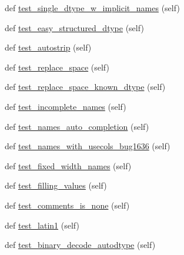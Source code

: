 \begin{DoxyCompactItemize}
\item 
def \hyperlink{classnumpy_1_1lib_1_1tests_1_1test__io_1_1TestFromTxt_a671e31bbe4da18bccec95fed75faee1b}{test\+\_\+single\+\_\+dtype\+\_\+w\+\_\+implicit\+\_\+names} (self)
\item 
def \hyperlink{classnumpy_1_1lib_1_1tests_1_1test__io_1_1TestFromTxt_a691374c15b0dcc795404cebf6a27ed0d}{test\+\_\+easy\+\_\+structured\+\_\+dtype} (self)
\item 
def \hyperlink{classnumpy_1_1lib_1_1tests_1_1test__io_1_1TestFromTxt_a51947789fe9f8ceefd6087f65335de97}{test\+\_\+autostrip} (self)
\item 
def \hyperlink{classnumpy_1_1lib_1_1tests_1_1test__io_1_1TestFromTxt_aa4052edd0a214f92558f53c72ac16fa7}{test\+\_\+replace\+\_\+space} (self)
\item 
def \hyperlink{classnumpy_1_1lib_1_1tests_1_1test__io_1_1TestFromTxt_a803ef344136b81b545dafa3c5c0922e3}{test\+\_\+replace\+\_\+space\+\_\+known\+\_\+dtype} (self)
\item 
def \hyperlink{classnumpy_1_1lib_1_1tests_1_1test__io_1_1TestFromTxt_ad1afc14c236a1093080c1174a5a8a330}{test\+\_\+incomplete\+\_\+names} (self)
\item 
def \hyperlink{classnumpy_1_1lib_1_1tests_1_1test__io_1_1TestFromTxt_a1a5a9e9351b32f747599b4049db359a9}{test\+\_\+names\+\_\+auto\+\_\+completion} (self)
\item 
def \hyperlink{classnumpy_1_1lib_1_1tests_1_1test__io_1_1TestFromTxt_a084438d283ee6c30d94d96da39b78a65}{test\+\_\+names\+\_\+with\+\_\+usecols\+\_\+bug1636} (self)
\item 
def \hyperlink{classnumpy_1_1lib_1_1tests_1_1test__io_1_1TestFromTxt_a97ebb5ceb0ce18216659695a1819c99c}{test\+\_\+fixed\+\_\+width\+\_\+names} (self)
\item 
def \hyperlink{classnumpy_1_1lib_1_1tests_1_1test__io_1_1TestFromTxt_a7f8a3ec0ed1a89d8b38da4e17a35b1a0}{test\+\_\+filling\+\_\+values} (self)
\item 
def \hyperlink{classnumpy_1_1lib_1_1tests_1_1test__io_1_1TestFromTxt_af95a04eac61b8f1cb05a20add97070ba}{test\+\_\+comments\+\_\+is\+\_\+none} (self)
\item 
def \hyperlink{classnumpy_1_1lib_1_1tests_1_1test__io_1_1TestFromTxt_a217d9e9ac40eace18d928bb35ca22f92}{test\+\_\+latin1} (self)
\item 
def \hyperlink{classnumpy_1_1lib_1_1tests_1_1test__io_1_1TestFromTxt_a3cb2b8cb36baa5dbfb0d2b513fdb723f}{test\+\_\+binary\+\_\+decode\+\_\+autodtype} (self)
\item 

\end{DoxyCompactItemize}

